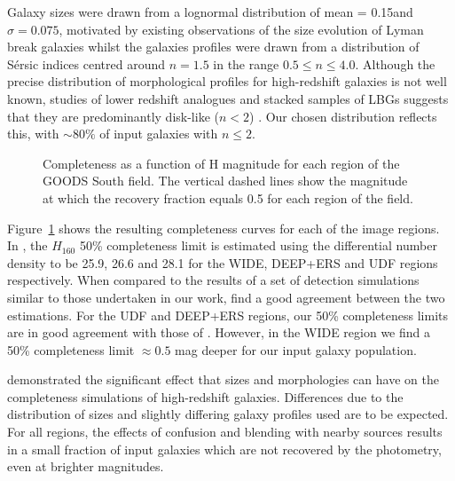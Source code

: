 Galaxy sizes were drawn from a lognormal distribution of mean = 0.15\arcsec and $\sigma = 0.075$, motivated by existing observations of the size evolution of Lyman break galaxies \citep{2004ApJ...600L.107F,2010ApJ...709L..21O,2011A&A...532A..33G,Huang:2013kb} whilst the galaxies profiles were drawn from a distribution of S\'{e}rsic indices centred around $n=1.5$ in the range $0.5 \le n \le 4.0$. Although the precise distribution of morphological profiles for high-redshift galaxies is not well known, studies of lower redshift analogues and stacked samples of LBGs suggests that they are predominantly disk-like ($n < 2$) \citep{Ravindranath:2006ie,Hathi:2007fh}. Our chosen distribution reflects this, with $\sim 80\%$ of input galaxies with $n \leq 2$.

\begin{figure}

\caption{Completeness as a function of H magnitude for each region of the GOODS South field. The vertical dashed lines show the magnitude at which the recovery fraction equals 0.5 for each region of the field.}
\label{fig:completeness}
\end{figure}

Figure~\ref{fig:completeness} shows the resulting completeness curves for each of the image regions. In \citet{Guo:2013ig}, the $H_{160}$ 50\% completeness limit is estimated using the differential number density to be 25.9, 26.6 and 28.1 for the WIDE, DEEP+ERS and UDF regions respectively. When compared to the results of a set of detection simulations similar to those undertaken in our work, \citet{Guo:2013ig} find a good agreement between the two estimations. For the UDF and DEEP+ERS regions, our 50\% completeness limits are in good agreement with those of \citet{Guo:2013ig}. However, in the WIDE region we find a 50\% completeness limit $\approx 0.5$ mag deeper for our input galaxy population.

\citet{2011A&A...532A..33G} demonstrated the significant effect that sizes and morphologies can have on the completeness simulations of high-redshift galaxies. Differences due to the distribution of sizes and slightly differing galaxy profiles used are to be expected. For all regions, the effects of confusion and blending with nearby sources results in a small fraction of input galaxies which are not recovered by the photometry, even at brighter magnitudes.

